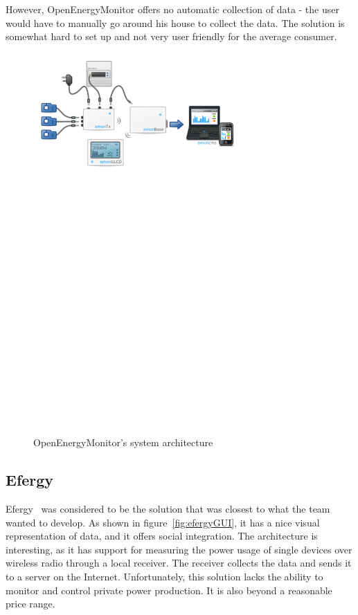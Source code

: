 However, OpenEnergyMonitor offers no automatic collection of data - the user would have to manually go around his house to collect the data. The solution is somewhat hard to set up and not very user friendly for the average consumer. 

\setcounter{figure}{1}
\begin{figure}[H]
\centering
\includegraphics[width=\textwidth, trim=0.5cm 19cm 6.5cm 0cm, clip]{ch/prestudy/fig/OEM_system.pdf}
\caption{OpenEnergyMonitor's system architecture}
\label{fig:oem}
\end{figure}


\newpage

\subsection{Efergy}

Efergy~\cite{efergy} was considered to be the solution that was closest to what the team wanted to develop. As shown in figure~\ref{fig:efergyGUI}, it has a nice visual representation of data, and it offers social integration. The architecture is interesting, as it  has support for measuring the power usage of single devices over wireless radio through a local receiver. The receiver collects the data and sends it to a server on the Internet. Unfortunately, this solution lacks the ability to monitor and control private power production. It is also beyond a reasonable price range.



